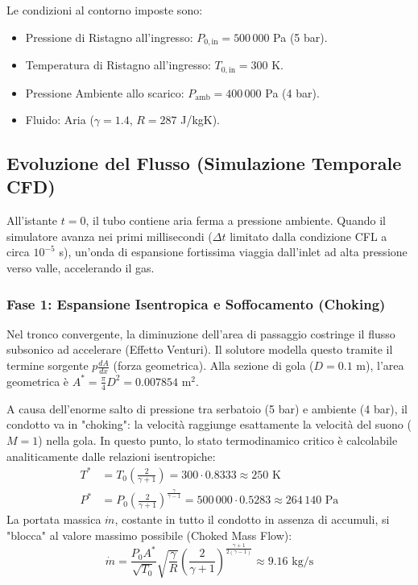 \documentclass[11pt,a4paper]{article}
\begin{document}
Le condizioni al contorno imposte sono:
\begin{itemize}
    \item Pressione di Ristagno all'ingresso: $P_{0, \text{in}} = 500\,000$ Pa (5 bar).
    \item Temperatura di Ristagno all'ingresso: $T_{0, \text{in}} = 300$ K.
    \item Pressione Ambiente allo scarico: $P_{\text{amb}} = 400\,000$ Pa (4 bar).
    \item Fluido: Aria ($\gamma = 1.4$, $R = 287$ J/kgK).
\end{itemize}

\subsection{Evoluzione del Flusso (Simulazione Temporale CFD)}
All'istante $t=0$, il tubo contiene aria ferma a pressione ambiente. Quando il simulatore avanza nei primi millisecondi ($\Delta t$ limitato dalla condizione CFL a circa $10^{-5}$ s), un'onda di espansione fortissima viaggia dall'inlet ad alta pressione verso valle, accelerando il gas. 

\subsubsection{Fase 1: Espansione Isentropica e Soffocamento (Choking)}
Nel tronco convergente, la diminuzione dell'area di passaggio costringe il flusso subsonico ad accelerare (Effetto Venturi). Il solutore modella questo tramite il termine sorgente $p \frac{dA}{dx}$ (forza geometrica). Alla sezione di gola ($D=0.1$ m), l'area geometrica è $A^* = \frac{\pi}{4} D^2 = 0.007854 \text{ m}^2$.

A causa dell'enorme salto di pressione tra serbatoio (5 bar) e ambiente (4 bar), il condotto va in "choking": la velocità raggiunge esattamente la velocità del suono ($M=1$) nella gola. In questo punto, lo stato termodinamico critico è calcolabile analiticamente dalle relazioni isentropiche:
\begin{align}
    T^* &= T_0 \left( \frac{2}{\gamma + 1} \right) = 300 \cdot 0.8333 \approx 250 \text{ K} \\
    P^* &= P_0 \left( \frac{2}{\gamma + 1} \right)^{\frac{\gamma}{\gamma-1}} = 500\,000 \cdot 0.5283 \approx 264\,140 \text{ Pa}
\end{align}
La portata massica $\dot{m}$, costante in tutto il condotto in assenza di accumuli, si "blocca" al valore massimo possibile (Choked Mass Flow):
\begin{equation}
    \dot{m} = \frac{P_0 A^*}{\sqrt{T_0}} \sqrt{\frac{\gamma}{R}} \left( \frac{2}{\gamma+1} \right)^{\frac{\gamma+1}{2(\gamma-1)}} \approx 9.16 \text{ kg/s}
\end{equation}
\end{document}
